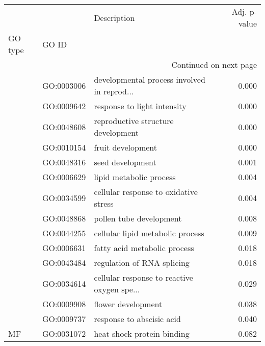 \begin{longtable}{lllr}
\toprule
   &            &                                  Description &  Adj. p-value \\
GO type & GO ID &                                              &               \\
\midrule
\endhead
\midrule
\multicolumn{4}{r}{{Continued on next page}} \\
\midrule
\endfoot

\bottomrule
\endlastfoot
\multirow{14}{*}{BP} & GO:0003006 &  developmental process involved in reprod... &         0.000 \\
   & GO:0009642 &                  response to light intensity &         0.000 \\
   & GO:0048608 &           reproductive structure development &         0.000 \\
   & GO:0010154 &                            fruit development &         0.000 \\
   & GO:0048316 &                             seed development &         0.001 \\
   & GO:0006629 &                      lipid metabolic process &         0.004 \\
   & GO:0034599 &        cellular response to oxidative stress &         0.004 \\
   & GO:0048868 &                      pollen tube development &         0.008 \\
   & GO:0044255 &             cellular lipid metabolic process &         0.009 \\
   & GO:0006631 &                 fatty acid metabolic process &         0.018 \\
   & GO:0043484 &                   regulation of RNA splicing &         0.018 \\
   & GO:0034614 &  cellular response to reactive oxygen spe... &         0.029 \\
   & GO:0009908 &                           flower development &         0.038 \\
   & GO:0009737 &                    response to abscisic acid &         0.040 \\
\cline{1-4}
MF & GO:0031072 &                   heat shock protein binding &         0.082 \\
\end{longtable}
